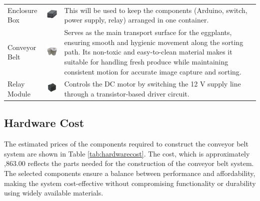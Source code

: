 {\begin{longtable}{
		>{\centering\arraybackslash}m{3cm}  
		>{\centering\arraybackslash}m{4cm} 
		>{\arraybackslash}m{6cm}
	}
	Enclosure Box &
	\includegraphics[width=3cm]{figures/box} &
	This will be used to keep the components (Arduino, switch, power supply, relay) arranged in one container. \\
	
	Conveyor Belt &
	\includegraphics[width=3cm]{figures/belt} &
	Serves as the main transport surface for the eggplants, ensuring smooth and hygienic movement along the sorting path. Its non-toxic and easy-to-clean material makes it suitable for handling fresh produce while maintaining consistent motion for accurate image capture and sorting. \\
	
	Relay Module &
	\includegraphics[width=3cm]{figures/relay} &
	Controls the DC motor by switching the 12 V supply line through a transistor-based driver circuit. \\
	
\end{longtable}

\subsection{Hardware Cost}
The estimated prices of the components required to construct the conveyor belt system are shown in Table \ref{tab:hardwarecost}. The cost, which is approximately ,863.00 reflects the parts needed for the construction of the conveyor belt system. The selected components ensure a balance between performance and affordability, making the system cost-effective without compromising functionality or durability using widely available materials.

}
